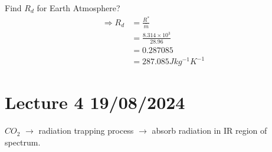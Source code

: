 \documentclass[fleqn,10pt]{SelfArx} %
\begin{document}
\begin{question}[label={q:3.3}]{Find $R_d$ for Earth Atmosphere?}
    \begin{align*}
        \Rightarrow R_d &= \frac{R^*}{\bar{m}} \\
            &= \frac{8.314 \times 10^3}{28.96}\\ 
            &= 0.287085 \\ 
            &= 287.085 Jkg^{-1}K^{-1}
    \end{align*}
\end{question}

\clearpage

\section{Lecture 4 19/08/2024}
$CO_2$ $\rightarrow$ radiation trapping process $\rightarrow$ absorb radiation in IR region of spectrum.
\end{document}
